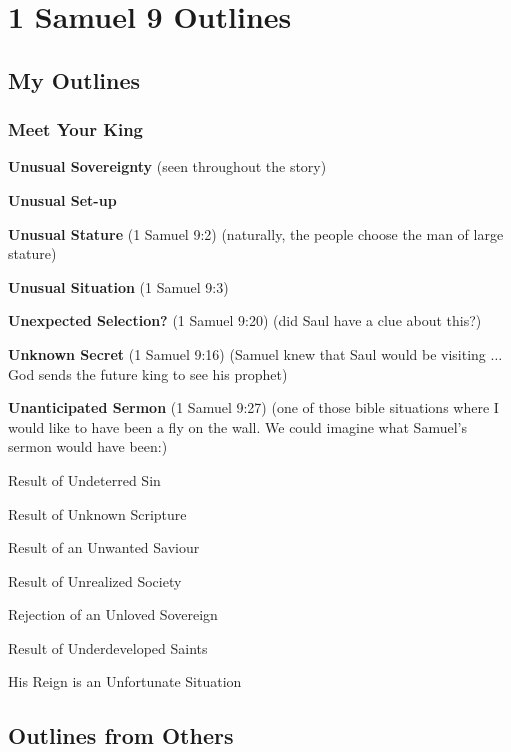 \section{1 Samuel 9 Outlines}

\subsection{My Outlines}

\subsubsection{Meet Your King}
\begin{compactenum}[I.]
     \item \textbf{Unusual Sovereignty} (seen throughout the story)%
     \item \textbf{Unusual Set-up} 
   \item \textbf{Unusual Stature} (1 Samuel 9:2) (naturally, the people choose the man of large stature)
    \item \textbf{Unusual Situation} (1 Samuel 9:3) 
    \item \textbf{Unexpected Selection?} (1 Samuel 9:20) (did Saul have a clue about this?)
    \item \textbf{Unknown Secret} (1 Samuel 9:16) (Samuel knew that Saul would be visiting $\hdots$ God sends the future king to see his prophet)
    \item \textbf{Unanticipated Sermon} (1 Samuel 9:27) (one of those bible situations where I would like to have been a fly on the wall. We could imagine what Samuel's sermon would have been:)
    \begin{compactenum}[A.]
    	\item Result of Undeterred Sin
    	\item Result of Unknown Scripture
    	\item Result of an Unwanted Saviour
    	\item Result of Unrealized Society
    	\item Rejection of an Unloved Sovereign
    	\item Result of Underdeveloped Saints
    	\item His Reign is an Unfortunate Situation
    \end{compactenum}
\end{compactenum}


\subsection{Outlines from Others}

